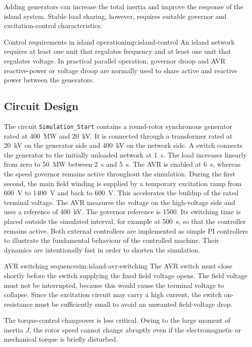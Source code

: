 Adding generators can increase the total inertia and improve the response of
the island system. Stable load sharing, however, requires suitable governor
and excitation-control characteristics.

\begin{important}{Control requirements in island operation}{imp:island-control}
An island network requires at least one unit that regulates frequency and at
least one unit that regulates voltage. In practical parallel operation,
governor droop and AVR reactive-power or voltage droop are normally used to
share active and reactive power between the generators.
\end{important}

\subsection{Circuit Design}

The circuit \texttt{Simulation\_Start} contains a round-rotor synchronous generator rated at
\SI{400}{\mega\watt} and \SI{20}{\kilo\volt}. It is connected through a
transformer rated at \SI{20}{\kilo\volt} on the generator side and
\SI{400}{\kilo\volt} on the network side. A switch connects the generator
to the initially unloaded network at \SI{1}{\second}.
The load increases linearly from zero to \SI{50}{\mega\watt} between
\SI{2}{\second} and \SI{5}{\second}. The AVR is enabled at
\SI{6}{\second}, whereas the speed governor remains active throughout the
simulation. During the first second, the main field winding is supplied by a
temporary excitation ramp from \SI{600}{\volt} to \SI{1400}{\volt} and
back to \SI{600}{\volt}. This accelerates the buildup of the rated terminal
voltage.
The AVR measures the voltage on the high-voltage side and uses a reference of
\SI{400}{\kilo\volt}. The governor reference is
\SI{1500}{\rpm}. Its switching time is placed outside the simulated interval,
for example at \SI{500}{\second}, so that the controller remains active.
Both external controllers are implemented as simple PI controllers to
illustrate the fundamental behaviour of the controlled machine. Their dynamics
are intentionally fast in order to shorten the simulation.

\begin{simulation}{AVR switching sequence}{sim:island-avr-switching}
The AVR switch must close shortly before the switch supplying the fixed field
voltage opens. The field voltage must not be interrupted, because this would
cause the terminal voltage to collapse. Since the excitation circuit may carry
a high current, the switch on-resistance must be sufficiently small to avoid an
unwanted field-voltage drop.

The torque-control changeover is less critical. Owing to the large moment of
inertia $J$, the rotor speed cannot change abruptly even if the electromagnetic
or mechanical torque is briefly disturbed.
\end{simulation}

